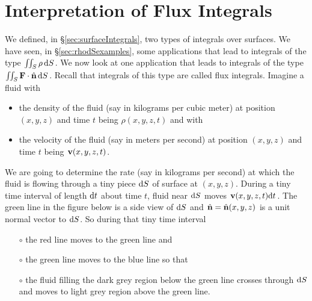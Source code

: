 \section{Interpretation of Flux Integrals}\label{sec:fluxIntegrals}

We defined, in \S\ref{sec:surfaceIntegrals}, two types of integrals 
over surfaces. We have seen, in \S\ref{sec:rhodSexamples}, some
applications that lead to integrals of the type 
$\iint_S \rho\,\mathrm{d}S$. We now look at one application that leads 
to integrals of the type $\iint_S \mathbf{F}\cdot\hat{\mathbf{n}}\,\mathrm{d}S$. Recall
that integrals of this type are called flux integrals. Imagine a fluid
with 
\begin{itemize}
\item
the density of the fluid (say in kilograms per cubic meter) at position
$(x,y,z)$ and time $t$ being $\rho(x,y,z,t)$ and with

\item
the velocity of the fluid  (say in meters per second) at position
$(x,y,z)$ and time $t$ being $\mathbf{v}(x,y,z,t)$. 
\end{itemize}
We are going to determine the rate (say in kilograms per second) 
at which the fluid is flowing through a tiny piece $\mathrm{d}S$ of surface 
at $(x,y,z)$. During a tiny time interval of length $\mathrm{d}t$ about
time $t$, fluid near $\mathrm{d}S$ moves $\mathbf{v}(x,y,z,t)\mathrm{d}t$. The green
line in the figure below is a side view of $\mathrm{d}S$ and $\hat{\mathbf{n}}=\hat{\mathbf{n}}(x,y,z)$ is a unit 
normal vector to $\mathrm{d}S$.
So during that tiny time interval
\begin{itemize}\itemsep1pt \parskip0pt  %
\item[$\circ$] the red line moves to the green line and
\item[$\circ$] the green line moves to the blue line so that
\item[$\circ$] the fluid filling the dark grey region below the green line
crosses through $\mathrm{d}S$ and moves to light grey region above the green line.
\end{itemize}
